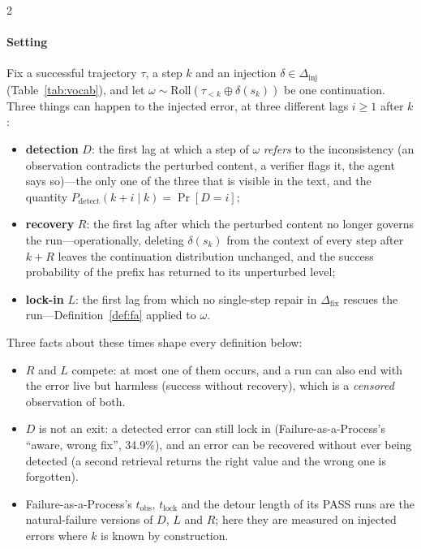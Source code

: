 \begin{multicols}{2}
\paragraph{Setting} Fix a successful trajectory $\tau$, a step $k$ and an injection $\delta\in\Delta_{\mathrm{inj}}$ (Table~\ref{tab:vocab}), and let $\omega\sim\mathrm{Roll}(\tau_{<k}\oplus\delta(s_k))$ be one continuation. Three things can happen to the injected error, at three different lags $i\ge1$ after $k$:
\begin{itemize}[leftmargin=1.1em]
\item \textbf{detection} $D$: the first lag at which a step of $\omega$ \emph{refers} to the inconsistency (an observation contradicts the perturbed content, a verifier flags it, the agent says so)---the only one of the three that is visible in the text, and the quantity $P_{\mathrm{detect}}(k{+}i\mid k)=\Pr[D{=}i]$;
\item \textbf{recovery} $R$: the first lag after which the perturbed content no longer governs the run---operationally, deleting $\delta(s_k)$ from the context of every step after $k{+}R$ leaves the continuation distribution unchanged, and the success probability of the prefix has returned to its unperturbed level;
\item \textbf{lock-in} $L$: the first lag from which no single-step repair in $\Delta_{\mathrm{fix}}$ rescues the run---Definition~\ref{def:fa} applied to $\omega$.
\end{itemize}
Three facts about these times shape every definition below:
\begin{itemize}[leftmargin=1.1em]
\item $R$ and $L$ compete: at most one of them occurs, and a run can also end with the error live but harmless (success without recovery), which is a \emph{censored} observation of both.
\item $D$ is not an exit: a detected error can still lock in (Failure-as-a-Process's ``aware, wrong fix'', 34.9\%), and an error can be recovered without ever being detected (a second retrieval returns the right value and the wrong one is forgotten).
\item Failure-as-a-Process's $t_{\mathrm{obs}}$, $t_{\mathrm{lock}}$ and the detour length of its PASS runs are the natural-failure versions of $D$, $L$ and $R$; here they are measured on injected errors where $k$ is known by construction.
\end{itemize}


\end{multicols}
